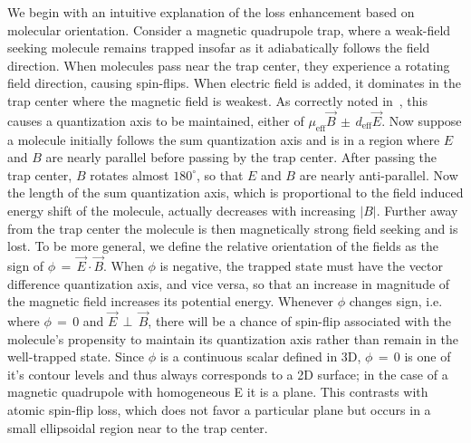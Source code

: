 \documentclass[%
 reprint,
 amsmath,amssymb,
 aps,
prl,
]{revtex4-1}
\newcommand{\epb}{{$\vec{E}\,{\perp}\,\vec{B}$}}
\begin{document}

We begin with an intuitive explanation of the loss enhancement based on molecular orientation.
Consider a magnetic quadrupole trap, where a weak-field seeking molecule remains trapped insofar as it adiabatically follows the field direction. 
When molecules pass near the trap center, they experience a rotating field direction, causing spin-flips. 
When electric field is added, it dominates in the trap center where the magnetic field is weakest. 
As correctly noted in~\cite{Bohn2013}, this causes a quantization axis to be maintained, either of $\mu_\text{eff}\vec{B}\,{\pm}\, d_\text{eff}\vec{E}$.
Now suppose a molecule initially follows the sum quantization axis and is in a region where $E$ and $B$ are nearly parallel before passing by the trap center.
After passing the trap center, $B$ rotates almost $180^\circ$, so that $E$ and $B$ are nearly anti-parallel. 
Now the length of the sum quantization axis, which is proportional to the field induced energy shift of the molecule, actually decreases with increasing $|B|$.
Further away from the trap center the molecule is then magnetically strong field seeking and is lost. 
To be more general, we define the relative orientation of the fields as the sign of $\phi\,{=}\,\vec{E}\cdot\vec{B}$. 
When $\phi$ is negative, the trapped state must have the vector difference quantization axis, and vice versa, so that an increase in magnitude of the magnetic field increases its potential energy. 
Whenever $\phi$ changes sign, i.e. where $\phi\,{=}\,0$ and \epb, there will be a chance of spin-flip associated with the molecule's propensity to maintain its quantization axis rather than remain in the well-trapped state.
Since $\phi$ is a continuous scalar defined in 3D, $\phi\,{=}\,0$ is one of it's contour levels and thus always corresponds to a 2D surface; in the case of a magnetic quadrupole with homogeneous E it is a plane.
This contrasts with atomic spin-flip loss, which does not favor a particular plane but occurs in a small ellipsoidal region near to the trap center.
\end{document}

